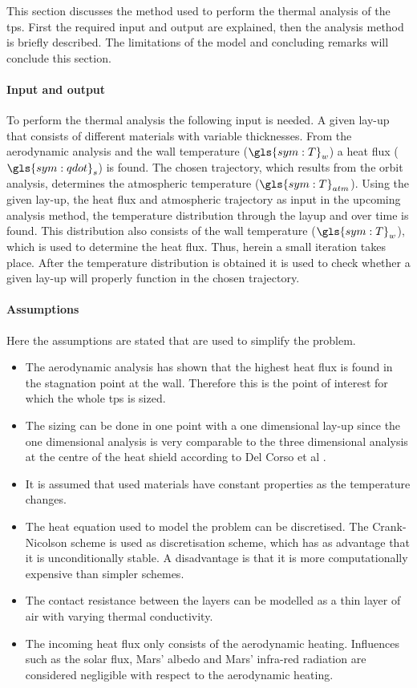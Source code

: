 This section discusses the method used to perform the thermal analysis of the \gls{tps}. First the required input and output are explained, then the analysis method is briefly described. The limitations of the model and concluding remarks will conclude this section.

\paragraph{Input and output}
To perform the thermal analysis the following input is needed. A given lay-up that consists of different materials with variable thicknesses. From the aerodynamic analysis and the wall temperature ($\gls{sym:T}_w$) a heat flux ($\gls{sym:qdot}_s$) is found. The chosen trajectory, which results from the orbit analysis, determines the atmospheric temperature ($\gls{sym:T}_{atm}$). Using the given lay-up, the heat flux and atmospheric trajectory as input in the upcoming analysis method, the temperature distribution through the layup and over time is found. This distribution also consists of the wall temperature ($\gls{sym:T}_w$), which is used to determine the heat flux. Thus, herein a small iteration takes place. After the temperature distribution is obtained it is used to check whether a given lay-up will properly function in the chosen trajectory.

\paragraph{Assumptions}
Here the assumptions are stated that are used to simplify the problem.
\begin{itemize}
	\item The aerodynamic analysis has shown that the highest heat flux is found in the stagnation point at the wall. Therefore this is the point of interest for which the whole \gls{tps} is sized.
	\item The sizing can be done in one point with a one dimensional lay-up since the one dimensional analysis is very comparable to the three dimensional analysis at the centre of the heat shield according to Del Corso et al \cite{Corso2009}.
	\item It is assumed that used materials have constant properties as the temperature changes. 
	\item The heat equation used to model the problem can be discretised. The Crank-Nicolson scheme is used as discretisation scheme, which has as advantage that it is unconditionally stable. A disadvantage is that it is more computationally expensive than simpler schemes.
	\item The contact resistance between the layers can be modelled as a thin layer of air with varying thermal conductivity.
	\item The incoming heat flux only consists of the aerodynamic heating. Influences such as the solar flux, Mars' albedo and Mars' infra-red radiation are considered negligible with respect to the aerodynamic heating.
\end{itemize}


